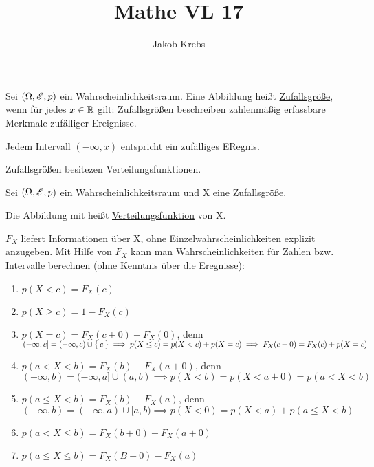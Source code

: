 \documentclass{../tudscript}
\title{Mathe VL 17}
\author{Jakob Krebs}
\begin{document}
Sei $(\Omega, \mathscr{E}, p)$ ein Wahrscheinlichkeitsraum. Eine Abbildung
heißt \underline{Zufallsgröße}, wenn für jedes $x \in \mathbb{R}$ gilt:
Zufallsgrößen beschreiben zahlenmäßig erfassbare Merkmale zufälliger Ereignisse.

Jedem Intervall $(- \infty, x)$ entspricht ein zufälliges ERegnis.

Zufallsgrößen besitezen Verteilungsfunktionen.


Sei $(\Omega, \mathscr{E}, p)$ ein Wahrscheinlichkeitsraum und X eine Zufallsgröße.

Die Abbildung
mit 
heißt \underline{Verteilungsfunktion} von X.

$F_X$ liefert Informationen über X, ohne Einzelwahrscheinlichkeiten explizit anzugeben. Mit Hilfe von $F_X$
kann man Wahrscheinlichkeiten für Zahlen bzw. Intervalle berechnen (ohne Kenntnis über die Eregnisse):

\begin{enumerate}
\item $p(X < c) = F_X (c)$
\item $p(X \geq c) = 1 - F_X (c)$
\item $p(X = c) = F_X (c + 0) - F_X (0)$, denn $(- \infty, c] = (-\infty, c) \cup \Set{c} \implies p(X \leq c) = p(X < c) + p(X = c)\implies F_X (c + 0) = F_X (c) + p(X = c)$
\item $p(a < X < b) = F_X (b) - F_X (a+0)$, denn $(-\infty, b) = (-\infty, a] \cup (a,b) \implies p(X < b) = p(X < a +0) = p(a < X < b)$
\item $p(a \leq X < b) = F_X (b) - F_X (a)$, denn $(-\infty, b) = (- \infty, a) \cup [a, b) \implies p(X < 0) = p(X < a) + p(a \leq X < b)$
\item $p(a < X \leq b) = F_X (b + 0) - F_X (a +0)$
\item $p(a \leq X \leq b) = F_X (B +0) - F_X (a)$

\end{enumerate} 
\end{document}
